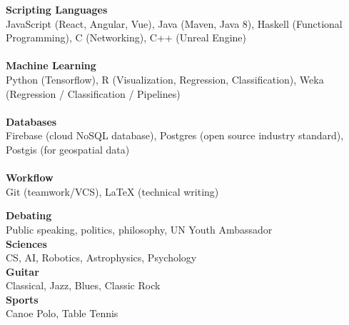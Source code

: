 \documentclass[9pt]{developercv}
\begin{document}
{{%
{
	{\textbf{Scripting Languages}}
	\\
	{JavaScript (React, Angular, Vue), Java (Maven, Java 8), Haskell (Functional Programming), C (Networking), C++ (Unreal Engine)}
	\\\\
}
{
	{\textbf{Machine Learning}}
	\\
	{Python (Tensorflow), R (Visualization, Regression, Classification), Weka (Regression / Classification / Pipelines) }
	\\\\
}
{
	{\textbf{Databases}}
	\\
	{Firebase (cloud NoSQL database), Postgres (open source industry standard), Postgis (for geospatial data)}
	\\\\
}
{
	{\textbf{Workflow}}
	\\
	{Git (teamwork/VCS), LaTeX (technical writing)}
}




{
	\textbf{Debating} \\
	Public speaking, politics, philosophy, UN Youth Ambassador\\
}
{
	\textbf{Sciences} \\
	CS, AI, Robotics, Astrophysics, Psychology \\
}
{
	\textbf{Guitar} \\
	Classical, Jazz, Blues, Classic Rock \\
}
{
	\textbf{Sports} \\
	Canoe Polo, Table Tennis
}



}}
\end{document}
